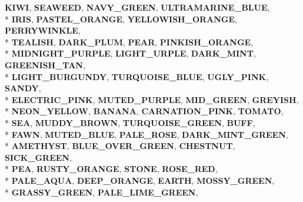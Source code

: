 \begin{DoxyCompactItemize}
{\bfseries K\+I\+WI}, 
{\bfseries S\+E\+A\+W\+E\+ED}, 
{\bfseries N\+A\+V\+Y\+\_\+\+G\+R\+E\+EN}, 
{\bfseries U\+L\+T\+R\+A\+M\+A\+R\+I\+N\+E\+\_\+\+B\+L\+UE}, 
\\*
{\bfseries I\+R\+IS}, 
{\bfseries P\+A\+S\+T\+E\+L\+\_\+\+O\+R\+A\+N\+GE}, 
{\bfseries Y\+E\+L\+L\+O\+W\+I\+S\+H\+\_\+\+O\+R\+A\+N\+GE}, 
{\bfseries P\+E\+R\+R\+Y\+W\+I\+N\+K\+LE}, 
\\*
{\bfseries T\+E\+A\+L\+I\+SH}, 
{\bfseries D\+A\+R\+K\+\_\+\+P\+L\+UM}, 
{\bfseries P\+E\+AR}, 
{\bfseries P\+I\+N\+K\+I\+S\+H\+\_\+\+O\+R\+A\+N\+GE}, 
\\*
{\bfseries M\+I\+D\+N\+I\+G\+H\+T\+\_\+\+P\+U\+R\+P\+LE}, 
{\bfseries L\+I\+G\+H\+T\+\_\+\+U\+R\+P\+LE}, 
{\bfseries D\+A\+R\+K\+\_\+\+M\+I\+NT}, 
{\bfseries G\+R\+E\+E\+N\+I\+S\+H\+\_\+\+T\+AN}, 
\\*
{\bfseries L\+I\+G\+H\+T\+\_\+\+B\+U\+R\+G\+U\+N\+DY}, 
{\bfseries T\+U\+R\+Q\+U\+O\+I\+S\+E\+\_\+\+B\+L\+UE}, 
{\bfseries U\+G\+L\+Y\+\_\+\+P\+I\+NK}, 
{\bfseries S\+A\+N\+DY}, 
\\*
{\bfseries E\+L\+E\+C\+T\+R\+I\+C\+\_\+\+P\+I\+NK}, 
{\bfseries M\+U\+T\+E\+D\+\_\+\+P\+U\+R\+P\+LE}, 
{\bfseries M\+I\+D\+\_\+\+G\+R\+E\+EN}, 
{\bfseries G\+R\+E\+Y\+I\+SH}, 
\\*
{\bfseries N\+E\+O\+N\+\_\+\+Y\+E\+L\+L\+OW}, 
{\bfseries B\+A\+N\+A\+NA}, 
{\bfseries C\+A\+R\+N\+A\+T\+I\+O\+N\+\_\+\+P\+I\+NK}, 
{\bfseries T\+O\+M\+A\+TO}, 
\\*
{\bfseries S\+EA}, 
{\bfseries M\+U\+D\+D\+Y\+\_\+\+B\+R\+O\+WN}, 
{\bfseries T\+U\+R\+Q\+U\+O\+I\+S\+E\+\_\+\+G\+R\+E\+EN}, 
{\bfseries B\+U\+FF}, 
\\*
{\bfseries F\+A\+WN}, 
{\bfseries M\+U\+T\+E\+D\+\_\+\+B\+L\+UE}, 
{\bfseries P\+A\+L\+E\+\_\+\+R\+O\+SE}, 
{\bfseries D\+A\+R\+K\+\_\+\+M\+I\+N\+T\+\_\+\+G\+R\+E\+EN}, 
\\*
{\bfseries A\+M\+E\+T\+H\+Y\+ST}, 
{\bfseries B\+L\+U\+E\+\_\+\+O\+V\+E\+R\+\_\+\+G\+R\+E\+EN}, 
{\bfseries C\+H\+E\+S\+T\+N\+UT}, 
{\bfseries S\+I\+C\+K\+\_\+\+G\+R\+E\+EN}, 
\\*
{\bfseries P\+EA}, 
{\bfseries R\+U\+S\+T\+Y\+\_\+\+O\+R\+A\+N\+GE}, 
{\bfseries S\+T\+O\+NE}, 
{\bfseries R\+O\+S\+E\+\_\+\+R\+ED}, 
\\*
{\bfseries P\+A\+L\+E\+\_\+\+A\+Q\+UA}, 
{\bfseries D\+E\+E\+P\+\_\+\+O\+R\+A\+N\+GE}, 
{\bfseries E\+A\+R\+TH}, 
{\bfseries M\+O\+S\+S\+Y\+\_\+\+G\+R\+E\+EN}, 
\\*
{\bfseries G\+R\+A\+S\+S\+Y\+\_\+\+G\+R\+E\+EN}, 
{\bfseries P\+A\+L\+E\+\_\+\+L\+I\+M\+E\+\_\+\+G\+R\+E\+EN}, 

\end{DoxyCompactItemize}
